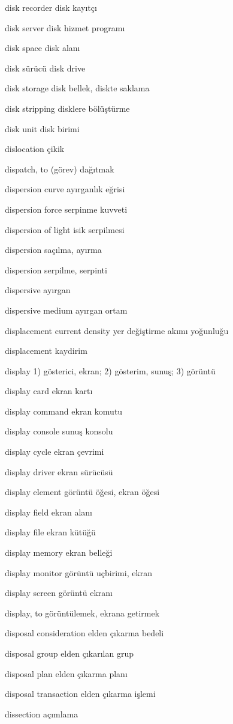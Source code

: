 \documentclass[12pt,fleqn]{article}\usepackage{../../common}
\begin{document}
disk recorder disk kayıtçı

disk server disk hizmet programı

disk space disk alanı

disk sürücü disk drive

disk storage disk bellek, diskte saklama

disk stripping disklere bölüştürme

disk unit disk birimi

dislocation çikik

dispatch, to (görev) dağıtmak

dispersion curve ayırganlık eğrisi

dispersion force serpinme kuvveti

dispersion of light isik serpilmesi

dispersion saçılma, ayırma

dispersion serpilme, serpinti

dispersive ayırgan

dispersive medium ayırgan ortam

displacement current density yer değiştirme akımı yoğunluğu

displacement kaydirim

display 1) gösterici, ekran; 2) gösterim, sunuş; 3) görüntü

display card ekran kartı

display command ekran komutu

display console sunuş konsolu

display cycle ekran çevrimi

display driver ekran sürücüsü

display element görüntü öğesi, ekran öğesi

display field ekran alanı

display file ekran kütüğü

display memory ekran belleği

display monitor görüntü uçbirimi, ekran

display screen görüntü ekranı

display, to görüntülemek, ekrana getirmek

disposal consideration elden çıkarma bedeli

disposal group elden çıkarılan grup

disposal plan elden çıkarma planı

disposal transaction elden çıkarma işlemi

dissection açımlama
\end{document}
